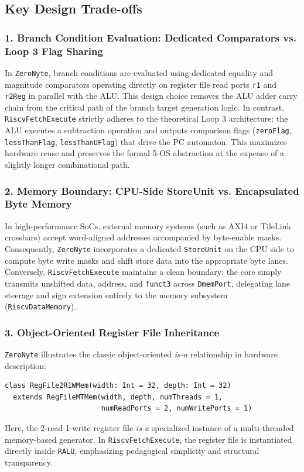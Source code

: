 \subsection{Key Design Trade-offs}

\subsubsection{1. Branch Condition Evaluation: Dedicated Comparators vs. Loop 3 Flag Sharing}
In \texttt{ZeroNyte}, branch conditions are evaluated using dedicated equality and magnitude comparators operating directly on register file read ports \texttt{r1} and \texttt{r2Reg} in parallel with the ALU. This design choice removes the ALU adder carry chain from the critical path of the branch target generation logic. In contrast, \texttt{RiscvFetchExecute} strictly adheres to the theoretical Loop 3 architecture: the ALU executes a subtraction operation and outputs comparison flags (\texttt{zeroFlag}, \texttt{lessThanFlag}, \texttt{lessThanUFlag}) that drive the PC automaton. This maximizes hardware reuse and preserves the formal 5-OS abstraction at the expense of a slightly longer combinational path.

\subsubsection{2. Memory Boundary: CPU-Side StoreUnit vs. Encapsulated Byte Memory}
In high-performance SoCs, external memory systems (such as AXI4 or TileLink crossbars) accept word-aligned addresses accompanied by byte-enable masks. Consequently, \texttt{ZeroNyte} incorporates a dedicated \texttt{StoreUnit} on the CPU side to compute byte write masks and shift store data into the appropriate byte lanes. Conversely, \texttt{RiscvFetchExecute} maintains a clean boundary: the core simply transmits unshifted data, address, and \texttt{funct3} across \texttt{DmemPort}, delegating lane steerage and sign extension entirely to the memory subsystem (\texttt{RiscvDataMemory}).

\subsubsection{3. Object-Oriented Register File Inheritance}
\texttt{ZeroNyte} illustrates the classic object-oriented \textit{is-a} relationship in hardware description:
\begin{verbatim}
class RegFile2R1WMem(width: Int = 32, depth: Int = 32)
  extends RegFileMTMem(width, depth, numThreads = 1,
                       numReadPorts = 2, numWritePorts = 1)
\end{verbatim}
Here, the 2-read 1-write register file \textit{is a} specialized instance of a multi-threaded memory-based generator. In \texttt{RiscvFetchExecute}, the register file is instantiated directly inside \texttt{RALU}, emphasizing pedagogical simplicity and structural transparency.


